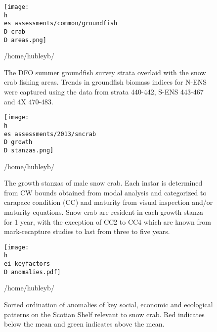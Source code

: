 \documentclass[11pt]{article}
\newcommand{\D}{.}
\newcommand{\h}{/home/hubleyb/}
\newcommand{\es}{bio.data/bio.snowcrab/}
\newcommand{\ei}{bio.data/bio.indicators/}
\begin{document}



\begin{figure}
\centering
\texttt{[image: \\h \\es assessments/common/groundfish\\D crab\\D areas.png]}
\caption{The DFO summer groundfish survey strata overlaid with the snow crab fishing areas. Trends in groundfish biomass indices for N-ENS were captured using the data from strata 440-442, S-ENS 443-467 and 4X 470-483.}
\h \end{figure}
\clearpage




\begin{figure}
\centering
\texttt{[image: \\h \\es assessments/2013/sncrab\\D growth\\D stanzas.png]}
\caption{The growth stanzas of male snow crab. Each instar is determined from CW bounds obtained from modal analysis and categorized to carapace condition (CC) and maturity from visual inspection and/or maturity equations. Snow crab are resident in each growth stanza for 1 year, with the exception of CC2 to CC4 which are known from mark-recapture studies to last from three to five years.}
\h \end{figure}
\clearpage

\begin{figure}
\centering
\texttt{[image: \\h \\ei keyfactors\\D anomalies.pdf]}
\caption{Sorted ordination of anomalies of key social, economic and ecological patterns on the Scotian Shelf relevant to snow crab. Red indicates below the mean and green indicates above the mean.}
\h \end{figure}
\clearpage
\end{document}
